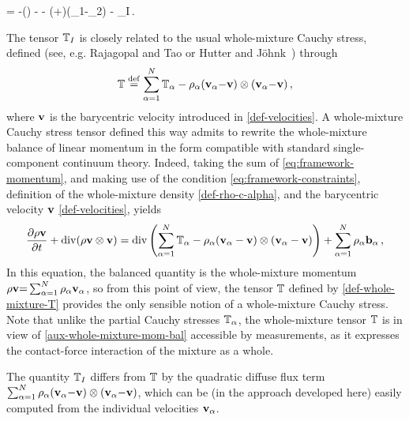 \documentclass[a4paper]{article}
\begin{document}
\be
\label{eq:formalism-interaction-force-final}
	\vecI = -\nabla(\gamma\EEEmix) - \mumixvec - \left(\alpha+\right)(\vv_1{-}\vv_2) - \TT_I\nabla \weight\,.
\ee
\begin{remark}
\label{remark-mixture-T}
The tensor $\mathbb{T}_I$ is closely related to the usual whole-mixture Cauchy stress, defined (see, e.g. Rajagopal and Tao \cite{Rajagopal-and-Tao-1995} or Hutter and J\"ohnk~\cite{hutter.k.johnk.k:continuum}) through
\begin{align}
\label{def-whole-mixture-T}
\mathbb{T} \stackrel{\mathrm{def}}{=}\sum_{\alpha=1}^N \mathbb{T}_\alpha -\rho_\alpha({\bf v}_\alpha{-}{\bf v})\otimes({\bf v}_\alpha{-}{\bf v})\,,
\end{align}
where ${\bf v}$ is the barycentric velocity introduced in \eqref{def-velocities}. A whole-mixture Cauchy stress tensor defined this way admits to rewrite the whole-mixture balance of linear momentum in the form compatible with standard single-component continuum theory. Indeed, taking the sum of \eqref{eq:framework-momentum}, and making use of the condition \eqref{eq:framework-constraints}, definition of the whole-mixture density \eqref{def-rho-c-alpha}, 
and the barycentric velocity ${\bf v}$ \eqref{def-velocities},
yields
\begin{align}
\label{aux-whole-mixture-mom-bal}
\frac{\partial \rho{\bf v}}{\partial t} + \mathop{\rm div}\nolimits(\rho{\bf v}\otimes{\bf v}) = \mathop{\rm div}\nolimits\left(\sum_{\alpha=1}^N\mathbb{T}_\alpha - \rho_\alpha({\bf v}_\alpha-{\bf v})\otimes({\bf v}_\alpha-{\bf v})\right) + \sum_{\alpha=1}^N\rho_\alpha{\bf{b}}_\alpha\,, 
\end{align}
In this equation, the  balanced quantity is the whole-mixture momentum $\rho{\bf v}{=}\sum_{\alpha=1}^N\rho_\alpha{\bf v}_\alpha$, so from this point of view, the tensor $\mathbb{T}$ defined by \eqref{def-whole-mixture-T} provides the only sensible notion of a whole-mixture Cauchy stress. Note that unlike the partial Cauchy stresses $\mathbb{T}_\alpha$, the whole-mixture tensor $\mathbb{T}$ is in view of \eqref{aux-whole-mixture-mom-bal} accessible by measurements, as it expresses the contact-force interaction of the mixture as a whole. 

The quantity $\mathbb{T}_I$ differs from $\mathbb{T}$ by the quadratic diffuse flux term $\sum_{\alpha=1}^N\rho_\alpha({\bf v}_\alpha{-}{\bf v})\otimes({\bf v}_\alpha{-}{\bf v})$,  which can be (in the approach developed here) easily computed from the individual velocities ${\bf v}_{\alpha}$.  
\end{remark}
\end{document}
